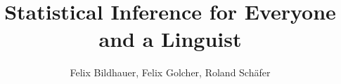 \author{Felix Bildhauer, Felix Golcher, Roland Schäfer}
\title{Statistical Inference for Everyone and a Linguist}
\subtitle{}
\renewcommand{\lsSeries}{tbls}
\renewcommand{\lsSeriesNumber}{}


\def\lsBookDOI{}
\def\lsISBNhardcover{}
\def\lsISBNsoftcover{}
\def\lsISBNdigital{}
\def\lsID{}

